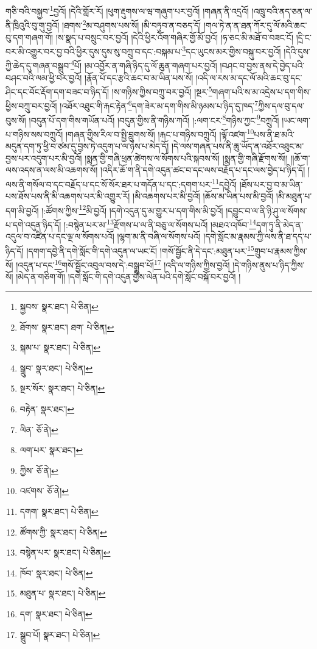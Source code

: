 གཅི་བའི་བསྐྱབ་\footnote{སྐྱབས་  སྣར་ཐང་།  པེ་ཅིན། }བྱའོ། །དེའི་གློར་རོ། །ཕུག་རྡུགས་ལ་ཝ་གཞུག་པར་བྱའོ། །གཞན་ནི་འདྲའོ། །འཁྲུ་བའི་ནད་ཅན་ལ་ནི་ཁྲིའུའི་བུ་གུ་བྱའོ། །ཐགས་\footnote{ཐོགས་  སྣར་ཐང་། ཐག་  པེ་ཅིན། }མ་བཤུགས་པས་སོ། །མི་བཏུབ་ན་བཅད་དོ། །གལ་ཏེ་ན་ན་ཐན་ཀོར་དུ་ལོ་མའི་ཆང་བུ་དག་གཞག་གོ། །ས་སྣད་པ་བསྲུང་བར་བྱའོ། །དེའི་ཕྱིར་འོག་གཞིར་གྱོ་མོ་བྱའོ། །ཧ་ཅང་མི་མཐོ་བ་བཟང་ངོ། །དྲི་ང་བར་མི་འགྱུར་བར་བྱ་བའི་ཕྱིར་དུས་དུས་སུ་བཀྲུ་བ་དང་:བསྐམ་པ་\footnote{སྐམ་པ་  སྣར་ཐང་།  པེ་ཅིན། }དང་ཡུངས་མར་གྱིས་བསྐུ་བར་བྱའོ། །དེའི་དུས་ཀྱི་ཆེད་དུ་གཞན་བསྒྲུབ་\footnote{སྒྲུབ་  སྣར་ཐང་།  པེ་ཅིན། }པོ། །མ་འབྱོར་ན་གཞི་ཉིད་དུ་ལོ་ཆུན་གཞག་པར་བྱའོ། །བཤང་བ་བྱས་ནས་དེ་བྱེད་པའི་བཤང་བའི་ལམ་ཕྱི་བར་བྱའོ། །རྣོན་པོ་དང་རྩའི་ཆང་བ་མ་ཡིན་པས་སོ། །འདི་ལ་རས་མ་དང་ལོ་མའི་ཆང་བུ་དང་ཤིང་དང་བོང་རྡོག་དག་བཟང་བ་ཉིད་དོ། །ས་གཉིས་ཀྱིས་བཀྲུ་བར་བྱའོ། །སྔར་\footnote{སྔར་སོར་  སྣར་ཐང་།  པེ་ཅིན། }གཞག་པའི་ས་མ་འདྲེས་པ་དག་གིས་ཕྱིས་བཀྲུ་བར་བྱའོ། །འཐོར་འཐུང་གི་རྐང་རྟེན་\footnote{བརྟེན་  སྣར་ཐང་། }དག་ཟེར་མ་དག་གིས་མི་ཉམས་པ་ཉིད་དུ་ཁད་\footnote{ལིན་  ཅོ་ནེ། }ཀྱིས་དལ་བུ་དལ་བུས་སོ། །བདུན་པོ་དག་གིས་གཡོན་པའོ། །བདུན་གྱིས་ནི་གཉིས་ཀའོ། །:ལག་ངར་\footnote{ལག་པར་  སྣར་ཐང་། }གཉིས་ཀྱང་\footnote{ཀྱིས་  ཅོ་ནེ། }བཀྲུའོ། །ཡང་ལག་པ་གཉིས་སས་བཀྲུའོ། །གཞན་གྱིས་རིལ་བ་སྤྱི་བླུགས་སོ། །རྐང་པ་གཉིས་བཀྲུའོ། །ལྟོ་འཛག་\footnote{འཛགས་  ཅོ་ནེ། }པས་ནི་ཐ་མའི་མདུན་དག་ཏུ་ཕྱི་བ་ཙམ་དུ་བྱས་ཏེ་འདུག་པ་ལ་ཉེས་པ་མེད་དོ། །དེ་ལས་གཞན་པས་ནི་ཆུ་ཡོད་ན་འཐོར་འཐུང་མ་བྱས་པར་འདུག་པར་མི་བྱའོ། །སྨན་གྱི་གཞི་ཕྲན་ཚེགས་ལ་སོགས་པའི་སྐབས་སོ། །སྨན་གྱི་གཞི་རྫོགས་སོ།། །།ཆོ་ག་ལས་འདས་ན་ལས་མི་འཆགས་སོ། །འདིར་ཆོ་ག་ནི་དགེ་འདུན་ཚང་བ་དང་ལས་བརྗོད་པ་དང་ལས་བྱེད་པ་ཉིད་དོ། །ལས་ནི་གསོལ་བ་དང་བརྗོད་པ་དང་སོ་སོར་ཐར་པ་གདོན་པ་དང་:དགག་པར་\footnote{དགག་  སྣར་ཐང་།  པེ་ཅིན། }དབྱེའོ། །ཐོས་པར་བྱ་བ་མ་ཡིན་པས་ཐོས་པས་ནི་མི་འཆགས་པར་མི་འགྱུར་རོ། །མི་འཆགས་པར་མི་བྱའོ། །ཆོས་མ་ཡིན་པས་མི་བྱའོ། །མི་མཐུན་པ་དག་མི་བྱའོ། །:ཚོགས་ཀྱིས་\footnote{ཚོགས་ཀྱི་  སྣར་ཐང་།  པེ་ཅིན། }མི་བྱའོ། །དགེ་འདུན་དུ་མ་གྱུར་པ་དག་གིས་མི་བྱའོ། །དབྱུང་བ་ལ་ནི་ཉི་ཤུ་ལ་སོགས་པ་དགེ་འདུན་ཉིད་དོ། །:བསྙེན་པར་མ་\footnote{བསྙེན་པར་  སྣར་ཐང་།  པེ་ཅིན། }རྫོགས་པ་ལ་ནི་བཅུ་ལ་སོགས་པའོ། །མཐའ་འཁོབ་\footnote{ཁོབ་  སྣར་ཐང་།  པེ་ཅིན། }དག་ཏུ་ནི་མེད་ན་འདུལ་བ་འཛིན་པ་དང་ལྔ་ལ་སོགས་པའོ། །ལྷག་མ་ནི་བཞི་ལ་སོགས་པའོ། །དགེ་སློང་མ་རྣམས་ཀྱི་ལས་ནི་ཐ་དད་པ་ཉིད་དོ། །དགག་དབྱེ་ནི་དགེ་སློང་གི་དགེ་འདུན་ལ་ཡང་ངོ། །གསོ་སྦྱོང་ནི་དེ་དང་:མཐུན་པར་\footnote{མཐུན་པ་  སྣར་ཐང་།  པེ་ཅིན། }གྲུབ་པ་རྣམས་ཀྱིས་སོ། །འདུན་པ་དང་\footnote{དག་  སྣར་ཐང་།  པེ་ཅིན། }གསོ་སྦྱོང་འབུལ་བས་དེ་:བསྒྲུབ་པོ།\footnote{སྒྲུབ་པོ།  སྣར་ཐང་།  པེ་ཅིན། } །འདི་ལ་གཉིས་ཀྱིས་བྱའོ། །དེ་གཉིས་ནུས་པ་ཉིད་ཀྱིས་སོ། །མེད་ན་གཅིག་གོ། །དགེ་སློང་གི་དགེ་འདུན་གྱིས་ལེན་པའི་དགེ་སློང་བསྐོ་བར་བྱའོ། །
